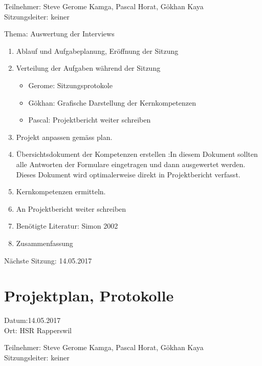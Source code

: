 Teilnehmer: Steve Gerome Kamga, Pascal Horat, Gökhan Kaya\\
Sitzungsleiter: keiner

Thema: Auswertung der Interviews

\begin{enumerate}

\item Ablauf und Aufgabeplanung, Eröffnung der Sitzung 

\item  Verteilung der Aufgaben während der Sitzung
\begin{itemize}
\item Gerome: Sitzungsprotokole
\item Gökhan: Grafische Darstellung der Kernkompetenzen
\item Pascal: Projektbericht weiter schreiben
\end{itemize}

\item	Projekt anpassen gemäss plan.


\item 	Übersichtsdokument der Kompetenzen erstellen :In diesem Dokument sollten alle Antworten der Formulare eingetragen und dann ausgewertet werden. Dieses Dokument wird optimalerweise direkt in Projektbericht verfasst.

\item 	Kernkompetenzen ermitteln.

\item 	An Projektbericht weiter schreiben

\item Benötigte Literatur: Simon 2002   \cite{simon2002entwicklung}

\item Zusammenfassung

\end{enumerate}

Nächste Sitzung: 14.05.2017

\newpage
\section*{Projektplan, Protokolle}

Datum:14.05.2017\\
Ort: HSR Rapperswil

Teilnehmer: Steve Gerome Kamga, Pascal Horat, Gökhan Kaya\\
Sitzungsleiter: keiner

